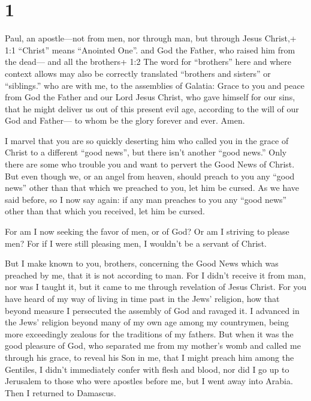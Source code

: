 \hypertarget{section}{%
\section{1}\label{section}}

 Paul, an apostle---not from men, nor through man, but
through Jesus Christ,+ 1:1 ``Christ'' means ``Anointed One''. and God
the Father, who raised him from the dead---  and all the
brothers+ 1:2 The word for ``brothers'' here and where context allows
may also be correctly translated ``brothers and sisters'' or
``siblings.'' who are with me, to the assemblies of Galatia:
 Grace to you and peace from God the Father and our Lord
Jesus Christ,  who gave himself for our sins, that he might
deliver us out of this present evil age, according to the will of our
God and Father---  to whom be the glory forever and ever.
Amen.

 I marvel that you are so quickly deserting him who called
you in the grace of Christ to a different ``good news'', 
but there isn't another ``good news.'' Only there are some who trouble
you and want to pervert the Good News of Christ.  But even
though we, or an angel from heaven, should preach to you any ``good
news'' other than that which we preached to you, let him be cursed.
 As we have said before, so I now say again: if any man
preaches to you any ``good news'' other than that which you received,
let him be cursed.

 For am I now seeking the favor of men, or of God? Or am I
striving to please men? For if I were still pleasing men, I wouldn't be
a servant of Christ.

 But I make known to you, brothers, concerning the Good
News which was preached by me, that it is not according to man.
 For I didn't receive it from man, nor was I taught it, but
it came to me through revelation of Jesus Christ.  For you
have heard of my way of living in time past in the Jews' religion, how
that beyond measure I persecuted the assembly of God and ravaged it.
 I advanced in the Jews' religion beyond many of my own age
among my countrymen, being more exceedingly zealous for the traditions
of my fathers.  But when it was the good pleasure of God,
who separated me from my mother's womb and called me through his grace,
 to reveal his Son in me, that I might preach him among the
Gentiles, I didn't immediately confer with flesh and blood,
 nor did I go up to Jerusalem to those who were apostles
before me, but I went away into Arabia. Then I returned to Damascus.

